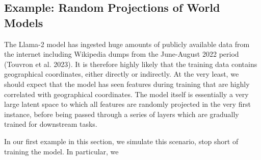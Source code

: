 \documentclass[
  letterpaper,
  DIV=11,
  numbers=noendperiod]{scrartcl}
\author{}
\date{}
\begin{document}
\ifdefined\Shaded\renewenvironment{Shaded}{\begin{tcolorbox}[borderline west={3pt}{0pt}{shadecolor}, sharp corners, breakable, interior hidden, enhanced, frame hidden, boxrule=0pt]}{\end{tcolorbox}}\fi

\hypertarget{example-random-projections-of-world-models}{%
\subsection{Example: Random Projections of World
Models}\label{example-random-projections-of-world-models}}

The Llama-2 model has ingested huge amounts of publicly available data
from the internet including Wikipedia dumps from the June-August 2022
period (Touvron et al. 2023). It is therefore highly likely that the
training data contains geographical coordinates, either directly or
indirectly. At the very least, we should expect that the model has seen
features during training that are highly correlated with geographical
coordinates. The model itself is essentially a very large latent space
to which all features are randomly projected in the very first instance,
before being passed through a series of layers which are gradually
trained for downstream tasks.

In our first example in this section, we simulate this scenario, stop
short of training the model. In particular, we
\end{document}
